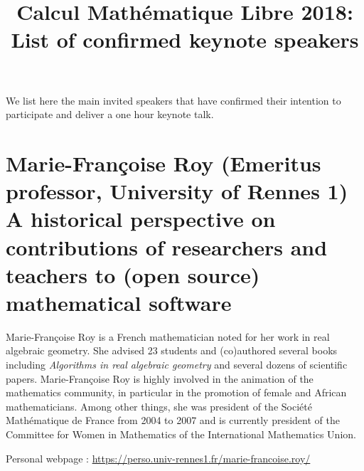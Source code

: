 \documentclass[12pt]{paper}
\title{Calcul Mathématique Libre 2018:\\ List of confirmed keynote speakers}
\date{}
\newcommand{\orateur}[3]{%
  \section*{%
    #1 {\small(#2)}\nopagebreak\\
    #3}
}
\begin{document}
\maketitle
\thispagestyle{empty}

We list here the main invited speakers that have confirmed their
intention to participate and deliver a one hour keynote talk.



\orateur
{Marie-Françoise Roy}
{Emeritus professor, University of Rennes 1}
{A historical perspective on contributions of researchers and teachers
  to (open source) mathematical software}

Marie-Françoise Roy is a French mathematician noted for her work in
real algebraic geometry. She advised 23 students and (co)authored
several books including \textit{Algorithms in real algebraic geometry} and
several dozens of scientific papers. Marie-Françoise Roy is highly
involved in the animation of the mathematics community, in particular
in the promotion of female and African mathematicians. Among other
things, she was president of the Société Mathématique de France from
2004 to 2007 and is currently president of the Committee for Women in
Mathematics of the International Mathematics Union.

Personal webpage : \url{https://perso.univ-rennes1.fr/marie-francoise.roy/}
\end{document}
